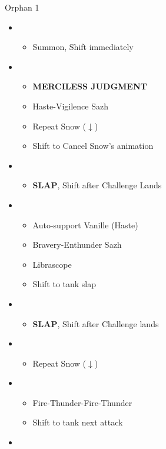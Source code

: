 \begin{battle}[3:00]{Orphan 1}
		\begin{itemize}
			\item \second
			      \begin{itemize}
				      \item Summon, Shift immediately
			      \end{itemize}
			\item \fourth
			      \begin{itemize}
				      \item \textbf{MERCILESS JUDGMENT}
				      \item Haste-Vigilence Sazh
				      \item Repeat Snow ($\downarrow$)
				      \item Shift to Cancel Snow's animation
			      \end{itemize}
			\item \third
			      \begin{itemize}
				      \item \textbf{SLAP}, Shift after Challenge Lands
			      \end{itemize}
			\item \fourth
			      \begin{itemize}
				      \item Auto-support Vanille (Haste)
				      \item Bravery-Enthunder Sazh
				      \item Librascope
				      \item Shift to tank slap
			      \end{itemize}
			\item \third
			      \begin{itemize}
				      \item \textbf{SLAP}, Shift after Challenge lands
			      \end{itemize}
			\item \fourth
			      \begin{itemize}
				      \item Repeat Snow ($\downarrow$)
			      \end{itemize}
			\item \fifth
			      \begin{itemize}
				      \item Fire-Thunder-Fire-Thunder
				      \item Shift to tank next attack
			      \end{itemize}
			\item \third

\end{itemize}
\end{battle}
